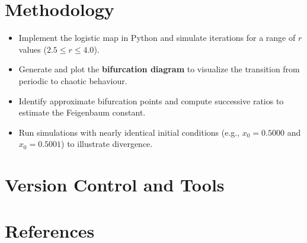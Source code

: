 \documentclass[12pt]{article}
\begin{document}
\section{Methodology}

\begin{itemize}
     

    \item Implement the logistic map in Python and simulate iterations for a range of \(r\) values (\(2.5 \leq r \leq 4.0\)).
    \item Generate and plot the \textbf{bifurcation diagram} to visualize the transition from periodic to chaotic behaviour.
    \item Identify approximate bifurcation points and compute successive ratios to estimate the Feigenbaum constant.
    \item Run simulations with nearly identical initial conditions (e.g., \(x_0 = 0.5000\) and \(x_0 = 0.5001\)) to illustrate divergence.
\end{itemize}
\section{Version Control and Tools}

\section{References}
\end{document}

